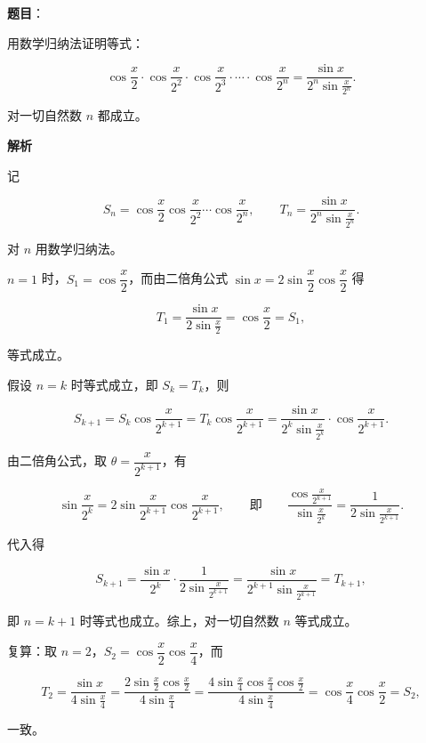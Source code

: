 \begin{answer}

\textbf{题目}：

用数学归纳法证明等式：

\nopagebreak[4]
\[
\cos\frac{x}{2}\cdot\cos\frac{x}{2^2}\cdot\cos\frac{x}{2^3}\cdot\cdots\cdot\cos\frac{x}{2^n}
=\frac{\sin x}{2^n\sin\frac{x}{2^n}}.
\]

对一切自然数 $n$ 都成立。

\textbf{解析}

记

\nopagebreak[4]
\[
S_n=\cos\frac{x}{2}\cos\frac{x}{2^2}\cdots\cos\frac{x}{2^n},\qquad
T_n=\frac{\sin x}{2^n\sin\frac{x}{2^n}}.
\]

对 $n$ 用数学归纳法。

$n=1$ 时，$S_1=\cos\dfrac x2$，而由二倍角公式 $\sin x=2\sin\dfrac x2\cos\dfrac x2$ 得

\nopagebreak[4]
\[
T_1=\frac{\sin x}{2\sin\frac x2}=\cos\frac x2=S_1,
\]

等式成立。

假设 $n=k$ 时等式成立，即 $S_k=T_k$，则

\nopagebreak[4]
\[
S_{k+1}=S_k\cos\frac{x}{2^{k+1}}
=T_k\cos\frac{x}{2^{k+1}}
=\frac{\sin x}{2^k\sin\frac{x}{2^k}}\cdot\cos\frac{x}{2^{k+1}}.
\]

由二倍角公式，取 $\theta=\dfrac{x}{2^{k+1}}$，有

\nopagebreak[4]
\[
\sin\frac{x}{2^k}=2\sin\frac{x}{2^{k+1}}\cos\frac{x}{2^{k+1}},
\qquad\text{即}\qquad
\frac{\cos\frac{x}{2^{k+1}}}{\sin\frac{x}{2^k}}=\frac{1}{2\sin\frac{x}{2^{k+1}}}.
\]

代入得

\nopagebreak[4]
\[
S_{k+1}=\frac{\sin x}{2^k}\cdot\frac{1}{2\sin\frac{x}{2^{k+1}}}
=\frac{\sin x}{2^{k+1}\sin\frac{x}{2^{k+1}}}=T_{k+1},
\]

即 $n=k+1$ 时等式也成立。综上，对一切自然数 $n$ 等式成立。

复算：取 $n=2$，$S_2=\cos\dfrac x2\cos\dfrac x4$，而

\nopagebreak[4]
\[
T_2=\frac{\sin x}{4\sin\frac x4}
=\frac{2\sin\frac x2\cos\frac x2}{4\sin\frac x4}
=\frac{4\sin\frac x4\cos\frac x4\cos\frac x2}{4\sin\frac x4}
=\cos\frac x4\cos\frac x2=S_2,
\]

一致。


\end{answer}
